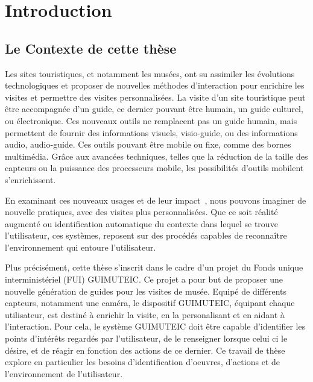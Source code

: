 \chapter{Introduction}


\section{Le Contexte de cette thèse}

Les sites touristiques, et notamment les musées, ont su assimiler les évolutions technologiques et proposer de nouvelles méthodes d'interaction pour enrichire les visites et permettre des visites personnalisées.
La visite d'un site touristique peut être accompagnée d'un guide, ce dernier pouvant être humain, un guide culturel, ou électronique.
Ces nouveaux outils ne remplacent pas un guide humain, mais permettent de fournir des informations visuels, visio-guide, ou des informations audio, audio-guide.
Ces outils pouvant être mobile ou fixe, comme des bornes multimédia.
Grâce aux avancées techniques, telles que la réduction de la taille des capteurs ou la puissance des processeurs mobile, les possibilités d'outils mobilent s'enrichissent.

En examinant ces nouveaux usages et de leur impact~\cite{andr2014}, nous pouvons imaginer de nouvelle pratiques, avec des visites plus personnalisées.
Que ce soit réalité augmenté ou identification automatique du contexte dans lequel se trouve l'utilisateur, ces systèmes, reposent sur des procédés capables de reconnaître l'environnement qui entoure l'utilisateur.

Plus précisément, cette thèse s'inscrit dans le cadre d'un projet du Fonds unique interministériel (FUI) GUIMUTEIC. 
Ce projet a pour but de proposer une nouvelle génération de guides pour les visites de musée.
Equipé de différents capteurs, notamment une caméra, le dispositif GUIMUTEIC, équipant chaque utilisateur, est destiné à enrichir la visite, en la personalisant et en aidant à l'interaction.
Pour cela, le système GUIMUTEIC doit être capable d'identifier les points d'intérêts regardés par l'utilisateur, de le renseigner lorsque celui ci le désire, et de réagir en fonction des actions de ce dernier.
Ce travail de thèse explore en particulier les besoins d'identification d'oeuvres, d'actions et de l'environnement de l'utilisateur. 


